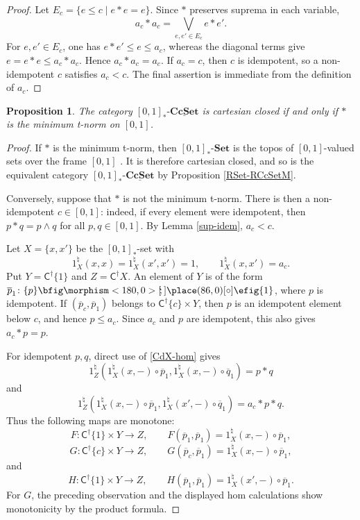 \documentclass{birkau}
\theoremstyle{plain}
\newtheorem{prop}[thm]{Proposition}
\theoremstyle{definition}
\def\oto{{\bfig\morphism<180,0>[\mkern-4mu`\mkern-4mu;]\place(86,0)[\circ]\efig}}
\newcommand{\nat}{\natural}
\newcommand{\sC}{\mathsf{C}}
\newcommand{\Set}{\mathbf{Set}}
\newcommand{\CcSet}{\mathbf{CcSet}}
\newcommand{\RSet}{[0,1]_*\text{-}\Set}
\newcommand{\RCcSetM}{[0,1]_*\text{-}\underline{\CcSet}}
\newcommand{\sCd}{\sC^{\dag}}
\renewcommand{\leq}{\leqslant}
\numberwithin{equation}{section}
\begin{document}
\begin{proof}
Let $E_c=\{e\leq c\mid e*e=e\}$. Since $*$ preserves suprema in each variable,
\[
a_c*a_c=\bigvee_{e,e'\in E_c}e*e'.
\]
For $e,e'\in E_c$, one has $e*e'\leq e\leq a_c$, whereas the diagonal terms give $e=e*e\leq a_c*a_c$. Hence $a_c*a_c=a_c$. If $a_c=c$, then $c$ is idempotent, so a non-idempotent $c$ satisfies $a_c<c$. The final assertion is immediate from the definition of $a_c$.
\end{proof}

\begin{prop} \label{RCcSetM-cc}
The category $\RCcSetM$ is cartesian closed if and only if $*$ is the minimum t-norm on $[0,1]$.
\end{prop}

\begin{proof}
If $*$ is the minimum t-norm, then $\RSet$ is the topos of $[0,1]$-valued sets over the frame $[0,1]$ \cite{Hoehle1992}. It is therefore cartesian closed, and so is the equivalent category $\RCcSetM$ by Proposition \ref{RSet-RCcSetM}.

Conversely, suppose that $*$ is not the minimum t-norm. There is then a non-idempotent $c\in[0,1]$: indeed, if every element were idempotent, then $p*q=p\wedge q$ for all $p,q\in[0,1]$. By Lemma \ref{sup-idem}, $a_c<c$.

Let $X=\{x,x'\}$ be the $[0,1]_*$-set with
\[
1_X^{\nat}(x,x)=1_X^{\nat}(x',x')=1,\qquad
1_X^{\nat}(x,x')=a_c.
\]
Put $Y=\sCd\{1\}$ and $Z=\sCd X$. An element of $Y$ is of the form $\overline{p}_1\colon\{p\}\oto\{1\}$, where $p$ is idempotent. If $(\overline{p}_c,\overline{p}_1)$ belongs to $\sCd\{c\}\times Y$, then $p$ is an idempotent element below $c$, and hence $p\leq a_c$. Since $a_c$ and $p$ are idempotent, this also gives $a_c*p=p$.

For idempotent $p,q$, direct use of \eqref{CdX-hom} gives
\[
1_Z^{\nat}\left(1_X^{\nat}(x,-)\circ\overline{p}_1,1_X^{\nat}(x,-)\circ\overline{q}_1\right)=p*q
\]
and
\[
1_Z^{\nat}\left(1_X^{\nat}(x,-)\circ\overline{p}_1,1_X^{\nat}(x',-)\circ\overline{q}_1\right)=a_c*p*q.
\]
Thus the following maps are monotone:
\[
F\colon\sCd\{1\}\times Y\to Z,\qquad
F(\overline{p}_1,\overline{p}_1)=1_X^{\nat}(x,-)\circ\overline{p}_1,
\]
\[
G\colon\sCd\{c\}\times Y\to Z,\qquad
G(\overline{p}_c,\overline{p}_1)=1_X^{\nat}(x,-)\circ\overline{p}_1,
\]
and
\[
H\colon\sCd\{1\}\times Y\to Z,\qquad
H(\overline{p}_1,\overline{p}_1)=1_X^{\nat}(x',-)\circ\overline{p}_1.
\]
For $G$, the preceding observation and the displayed hom calculations show monotonicity by the product formula.


\end{proof}
\end{document}
